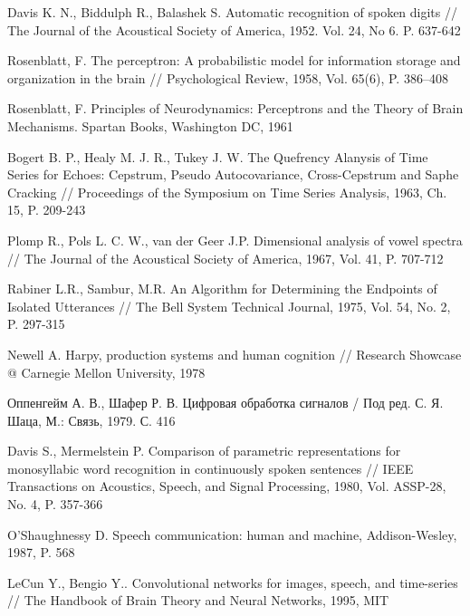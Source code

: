 \begin{thebibliography}{1}
Davis K. N., Biddulph R., Balashek S. Automatic recognition of spoken digits // The Journal of the Acoustical Society of America, 1952. Vol. 24, No 6. P. 637-642 

Rosenblatt, F. The perceptron: A probabilistic model for information storage and organization in the brain // Psychological Review, 1958, Vol. 65(6), P. 386–408

Rosenblatt, F. Principles of Neurodynamics: Perceptrons and the Theory of Brain Mechanisms. Spartan Books, Washington DC, 1961

Bogert B. P., Healy M. J. R., Tukey J. W. The Quefrency Alanysis of Time Series for Echoes: Cepstrum, Pseudo Autocovariance, Cross-Cepstrum and Saphe Cracking // Proceedings of the Symposium on Time Series Analysis, 1963, Ch. 15, P. 209-243

Plomp R., Pols L. C. W., van der Geer J.P. Dimensional analysis of vowel spectra // The Journal of the Acoustical Society of America, 1967, Vol. 41, P. 707-712 

Rabiner L.R., Sambur, M.R. An Algorithm for Determining the Endpoints of Isolated Utterances // The Bell System Technical Journal, 1975, Vol. 54, No. 2, P. 297-315

Newell A. Harpy, production systems and human cognition // Research Showcase @ Carnegie Mellon University, 1978

Оппенгейм А. В., Шафер Р. В. Цифровая обработка сигналов / Под ред. С. Я. Шаца, М.: Связь, 1979. С. 416

Davis S., Mermelstein P. Comparison of parametric representations for monosyllabic word recognition in continuously spoken sentences // IEEE Transactions on Acoustics, Speech, and Signal Processing, 1980, Vol. ASSP-28, No. 4, P. 357-366

O'Shaughnessy D. Speech communication: human and machine, Addison-Wesley, 1987, P. 568

LeCun Y., Bengio Y.. Convolutional networks for images, speech, and time-series // The Handbook of Brain Theory and Neural Networks, 1995, MIT 
\end{thebibliography}